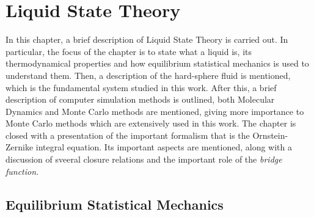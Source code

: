 \chapter{Liquid State Theory}
\label{Cap2}

In this chapter, a brief description of Liquid State Theory is carried out. In particular, 
the focus of the chapter is to state what a liquid is, its thermodynamical properties and
how equilibrium statistical mechanics is used to understand them. Then, a description of 
the hard-sphere fluid is mentioned, which is the fundamental system studied in this work.
After this, a brief description of computer simulation methods is outlined, both
Molecular Dynamics and Monte Carlo methods are mentioned, giving more importance to
Monte Carlo methods which are extensively used in this work.
The chapter is closed with a presentation of the important formalism that is the 
Ornstein-Zernike integral equation. Its important aspects are mentioned, along with
a discussion of sveeral closure relations and the important role of the
\emph{bridge function.}

\section{Equilibrium Statistical Mechanics}
\label{sec:eq-statmech}


